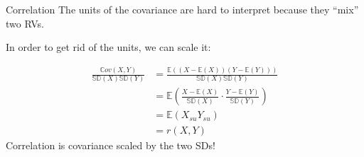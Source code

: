 \documentclass[aspectratio=169]{../latex_main/tntbeamer}  %
\begin{document}
	\begin{frame}[c]{Correlation}
	   The units of the covariance are hard to interpret because they ``mix'' two RVs.
	   
	   In order to get rid of the units, we can scale it:
	   
	   \begin{align*}
	       \frac{\mathbb{C}ov(X,Y)}{\mathbb{SD}(X)\mathbb{SD}(Y)}  &= \frac{ \mathbb{E}((X-\mathbb{E}(X))(Y-\mathbb{E}(Y)))}{\mathbb{SD}(X)\mathbb{SD}(Y)}\\
	       &= \mathbb{E}\left( \frac{X-\mathbb{E}(X)}{\mathbb{SD}(X)} \cdot \frac{Y-\mathbb{E}(Y)}{\mathbb{SD}(Y)}\right)\\
	       &= \mathbb{E}(X_{su}Y_{su})\\
	       &= r(X,Y)
	   \end{align*}
	   \alert{Correlation is covariance scaled by the two SDs!}
	\end{frame}
\end{document}
